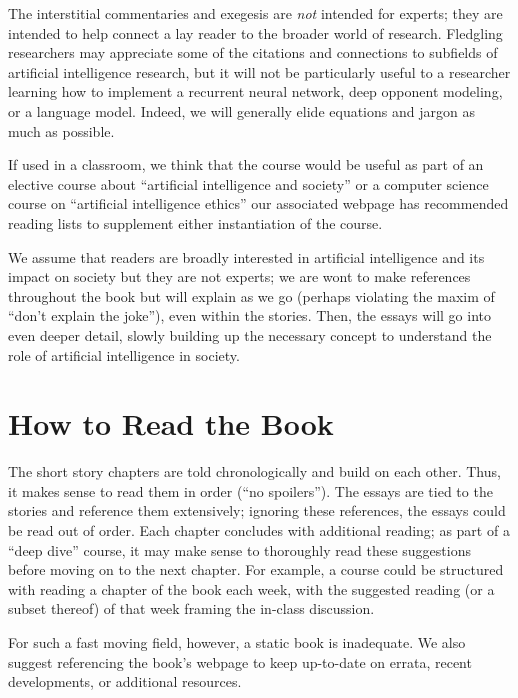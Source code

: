 The interstitial commentaries and exegesis are \emph{not} intended for experts; they are intended to help connect a lay reader to the broader world of research.  Fledgling researchers may appreciate some of the citations and connections to subfields of artificial intelligence research, but it will not be particularly useful to a researcher learning how to implement a recurrent neural network, deep opponent modeling, or a language model.  Indeed, we will generally elide equations and jargon as much as possible.

If used in a classroom, we think that the course would be useful as part of an elective course about ``artificial intelligence and society'' or a computer science course on ``artificial intelligence ethics'' our associated webpage has recommended reading lists to supplement either instantiation of the course.

We assume that readers are broadly interested in artificial intelligence and its impact on society but they are not experts; we are wont to make references throughout the book but will explain as we go (perhaps violating the maxim of ``don't explain the joke''), even within the stories.  Then, the essays will go into even deeper detail, slowly building up the necessary concept to understand the role of artificial intelligence in society.

\section{How to Read the Book}

The short story chapters are told chronologically and build on each other.  Thus, it makes sense to read them in order (``no spoilers'').  The essays are tied to the stories and reference them extensively; ignoring these references, the essays could be read out of order.  Each chapter concludes with additional reading; as part of a ``deep dive'' course, it may make sense to thoroughly read these suggestions before moving on to the next chapter.  For example, a course could be structured with reading a chapter of the book each week, with the suggested reading (or a subset thereof) of that week framing the in-class discussion.

For such a fast moving field, however, a static book is inadequate.  We also suggest referencing the book's webpage to keep up-to-date on errata, recent developments, or additional resources.
